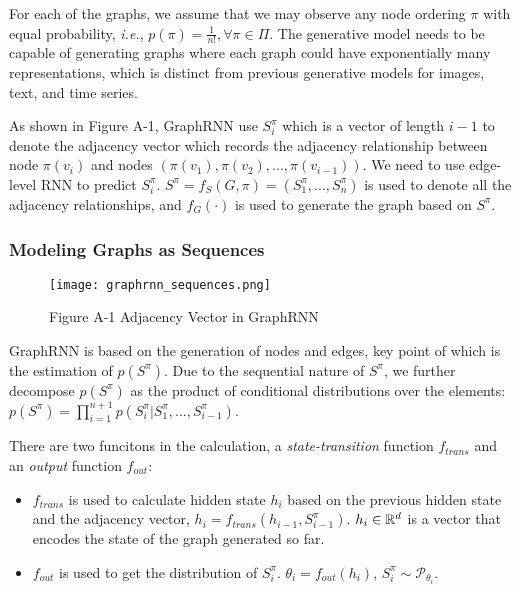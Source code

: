 \begin{survey}
For each of the graphs, we assume that we may observe any node ordering
\(\pi\) with equal probability, \emph{i.e.},
\(p(\pi) = \frac 1{n!} , \forall \pi \in \Pi\). The generative model
needs to be capable of generating graphs where each graph could have
exponentially many representations, which is distinct from previous
generative models for images, text, and time series.

As shown in Figure A-1, GraphRNN use \(S_i^\pi\) which is a vector of length \(i - 1\) to denote
the adjacency vector which records the adjacency relationship between
node \(\pi(v_i)\) and nodes
\(\left(\pi(v_1), \pi(v_2),...,\pi(v_{i-1})\right)\). We need to use
edge-level RNN to predict \(S_i^\pi\).
\(S^\pi=f_S(G,\pi)=(S_1^\pi, ..., S_n^\pi)\) is used to denote all the
adjacency relationships, and \(f_G(·)\) is used to generate the graph
based on \(S^\pi\).

\subsubsection{Modeling Graphs as Sequences}

\begin{figure}
  \centering
  \texttt{[image: graphrnn\_sequences.png]}
  \caption*{Figure A-1  Adjacency Vector in GraphRNN}
  \label{survey:GraphRNN}
\end{figure}

GraphRNN is based on the generation of nodes and edges, key point of
which is the estimation of \(p(S^\pi)\). Due to the sequential nature of
\(S^\pi\), we further decompose \(p(S^\pi)\) as the product of
conditional distributions over the elements:
\(p(S^\pi)=\prod\limits_{i=1}^{n+1}p(S_i^\pi|S_1^\pi, ...,S_{i-1}^\pi)\).

There are two funcitons in the calculation, a \emph{state-transition}
function \(f_{trans}\) and an \emph{output} function \(f_{out}\):

\begin{itemize}
\item
  \(f_{trans}\) is used to calculate hidden state \(h_i\) based on the
  previous hidden state and the adjacency vector,
  \(h_i=f_{trans}(h_{i-1}, S_{i-1}^\pi)\). \(h_i\in \mathbb{R}^d\) is a vector
  that encodes the state of the graph generated so far.
\item
  \(f_{out}\) is used to get the distribution of \(S_i^\pi\).
  \(\theta_i=f_{out}(h_i)\), \(S_i^\pi \sim \mathcal{P}_{\theta_{i}}\).
\end{itemize}


\end{survey}
